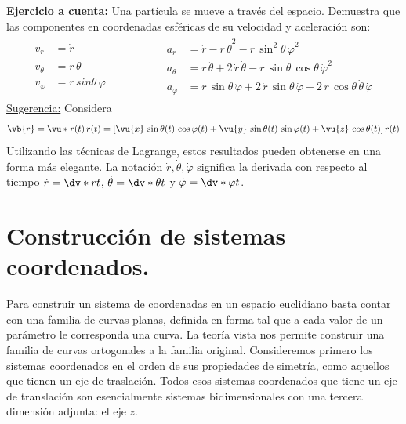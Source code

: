 \textbf{Ejercicio a cuenta:} Una partícula se mueve a través del espacio. Demuestra que las componentes en coordenadas esféricas de su velocidad y aceleración son:
\begin{align*}
\begin{aligned}
v_{r} &= \dot{r} \\
v_{\theta} &= r \, \dot{\theta} \\
v_{\varphi} &= r \, sin \theta \, \dot{\varphi}
\end{aligned}
\hspace{2cm}
\begin{aligned}
a_{r} &= \ddot{r} - r \, \dot{\theta}^{2} - r \, \sin^{2} \theta \, \dot{\varphi}^{2} \\
a_{\theta} &= r \, \ddot{\theta} + 2 \, \dot{r} \, \dot{\theta} - r \, \sin \theta \, \cos \theta \, \dot{\varphi}^{2} \\
a_{\varphi} &= r \, \sin \theta \, \ddot{\varphi} +  2 \, \dot{r} \, \sin \theta \, \dot{\varphi} + 2 \, r \, \cos \theta \, \dot{\theta} \, \dot{\varphi}
\end{aligned}
\end{align*}
\underline{Sugerencia:} Considera
\begin{align*}
\vb{r} = \vu*{r} (t) \, r(t) = [ \vu{x} \, \sin \theta (t)  \, \cos \varphi (t) + \vu{y} \, \sin \theta (t)  \, \sin \varphi (t) + \vu{z} \, \cos \theta (t) ] \, r(t)
\end{align*}
Utilizando las técnicas de Lagrange, estos resultados pueden obtenerse en una forma más elegante. La notación $\dot{r}, \dot{\theta}, \dot{\varphi}$ significa la derivada con respecto al tiempo $\dot{r} = \dv*{r}{t}$, $\dot{\theta} = \dv*{\theta}{t}$ y $\dot{\varphi} = \dv*{\varphi}{t}$.
\section{Construcción de sistemas coordenados.}
 Para construir un sistema de coordenadas en un espacio euclidiano basta contar con una familia de curvas planas, definida en forma tal que a cada valor de un parámetro le corresponda una curva. La teoría vista nos permite construir una familia de curvas ortogonales a la familia original. Consideremos primero los sistemas coordenados en el orden de sus propiedades de simetría, como aquellos que tienen un eje de traslación. Todos esos sistemas coordenados que tiene un eje de translación son esencialmente sistemas bidimensionales con una tercera dimensión adjunta: el eje $z$.
